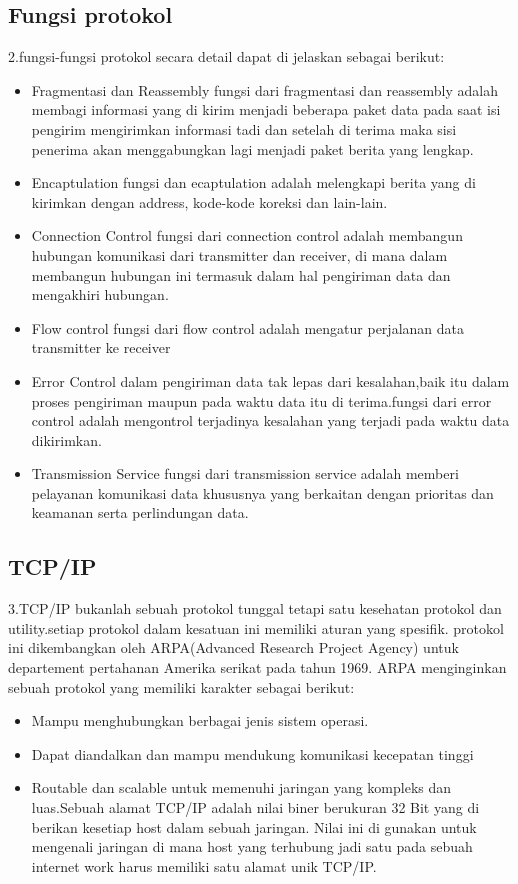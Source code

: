 \subsection{Fungsi protokol}
 2.fungsi-fungsi protokol secara detail dapat di jelaskan sebagai berikut:
 \begin{itemize}
   \item Fragmentasi dan Reassembly
         fungsi dari fragmentasi dan reassembly adalah membagi informasi yang di kirim menjadi beberapa paket data pada saat isi pengirim mengirimkan informasi tadi dan setelah di terima maka sisi penerima akan menggabungkan lagi menjadi paket berita yang lengkap.
   \item Encaptulation
         fungsi dan ecaptulation adalah melengkapi berita yang di kirimkan dengan address, kode-kode koreksi dan lain-lain.
   \item Connection Control
         fungsi dari connection control adalah membangun hubungan komunikasi dari transmitter dan receiver, di mana dalam membangun hubungan ini termasuk dalam hal pengiriman data dan mengakhiri hubungan.
   \item Flow control
         fungsi dari flow control adalah mengatur perjalanan data transmitter ke receiver
   \item Error Control
         dalam pengiriman data tak lepas dari kesalahan,baik itu dalam proses pengiriman maupun pada waktu data itu di terima.fungsi dari error control adalah mengontrol terjadinya kesalahan yang terjadi pada waktu data dikirimkan.
   \item Transmission Service
         fungsi dari transmission service adalah memberi pelayanan komunikasi data khususnya yang berkaitan dengan prioritas dan keamanan serta perlindungan data.
 \end{itemize}

\subsection{TCP/IP}
3.TCP/IP bukanlah sebuah protokol tunggal tetapi satu kesehatan protokol dan utility.setiap protokol dalam kesatuan ini memiliki aturan yang spesifik. protokol ini dikembangkan oleh ARPA(Advanced Research Project Agency) untuk departement pertahanan Amerika serikat pada tahun 1969.
ARPA menginginkan sebuah protokol yang memiliki karakter sebagai berikut:
\begin{itemize}
  \item Mampu menghubungkan berbagai jenis sistem operasi.
  \item Dapat diandalkan dan mampu mendukung komunikasi kecepatan tinggi
  \item Routable dan scalable untuk memenuhi jaringan yang kompleks dan luas.Sebuah alamat TCP/IP adalah nilai biner berukuran 32 Bit yang di berikan kesetiap host dalam sebuah jaringan. Nilai ini di gunakan untuk mengenali jaringan di mana host yang terhubung jadi satu pada sebuah internet work harus memiliki satu alamat unik TCP/IP.
\end{itemize}

